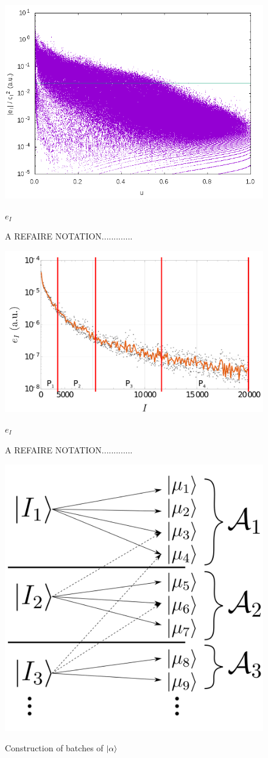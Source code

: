 \documentclass[./thesis.tex]{subfiles}
\begin{document}
\begin{figure}[h!]
	\begin{center}
		\includegraphics[width=0.9\columnwidth]{figures/pt2/eici2}
		\caption{A REFAIRE NOTATION.............}
		\label{fig:eici2}
		$e_I$
	\end{center}
\end{figure}


\begin{figure}[h!]
	\begin{center}
		\includegraphics[width=0.9\columnwidth]{figures/pt2/P_i}
		\caption{A REFAIRE NOTATION.............}
		\label{fig:p_i}
		$e_I$
	\end{center}
\end{figure}



\begin{figure}[h!]
	\begin{center}
		\includegraphics[width=0.5\columnwidth]{figures/pt2/mu_sample}
		\caption{}
		\label{fig:mu_sample}
		Construction of batches of $\ket \alpha$
	\end{center}
\end{figure}
\end{document}
